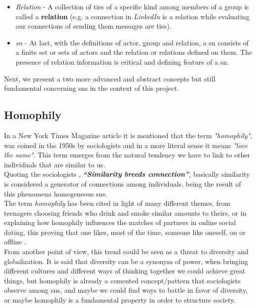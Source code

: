 \begin{itemize}
    \item \emph{Relation} - A collection of ties of a specific kind among members of a group is called a \textbf{relation} (e.g. a connection in \textit{LinkedIn} is a relation while evaluating our connections of sending them messages are ties).
    \item \emph{\gls{sn}} - At last, with the definitions of actor, group and relation, a \gls{sn} consists of a finite set or sets of actors and the relation or relations defined on them. The presence of relation information is critical and defining feature of a \gls{sn}.
\end{itemize}

Next, we present a two more advanced and abstract concepts but still fundamental concerning \glspl{sn} in the context of this project.

\subsection*{Homophily}

In a New York Times Magazine article \citep{nytmagazinehomop} it is mentioned that the term \textit{"homophily"}, was coined in the 1950s by sociologists and in a more literal sense it means \textit{"love the same"}. This term emerges from the natural tendency we have to link to other individuals that are similar to us.\\
\indent Quoting the sociologists \citep{mcpherson2001birds}, \textbf{\textit{“Similarity breeds connection”}}, basically similarity is considered a generator of connections among individuals, being the result of this phenomena homogeneous \glspl{sn}.\\
\indent The term \textit{homophily} has been cited in light of many different themes, from teenagers choosing friends who drink and smoke similar amounts to theirs, or in explaining how homophily influences the matches of partners in online social dating, this proving that one likes, most of the time, someone like oneself, on or offline \citep{fiore2005homophily}.\\
\indent From another point of view, this trend could be seen as a threat to diversity and globalization. It is said that diversity can be a synonym of power, when bringing different cultures and different ways of thinking together we could achieve great things, but homophily is already a cemented concept/pattern that sociologists observe among \glspl{sn}, and maybe we could find ways to battle in favor of diversity, or maybe homophily is a fundamental property in order to structure society.

